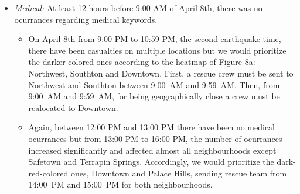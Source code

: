 \begin{itemize}                                                                  
     \item \emph{Medical:} At least 12 hours before 9:00 AM of April 8th, there was no ocurrances regarding
medical keywords. 
\begin{itemize} 
\item On April 8th from 9:00 PM to 10:59 PM, the second earthquake
time, there have been casualties on multiple locations
but we would prioritize the darker colored ones according to the heatmap of Figure 8a:
Northwest, Southton and Downtown. First, a rescue crew must be sent to Northwest
and Southton between     
     9:00~AM and 9:59~AM. Then, from 9:00~AM and 9:59~AM, for being geographically close a crew must be realocated to
Downtown. 

\item Again, between 12:00 PM and 13:00 PM there have been no medical ocurrances but from 13:00 PM
to 16:00 PM, the number of ocurrances increased significantly and affected
almost all neighbourhoods except Safetown and Terrapin Springs. Accordingly, we
would prioritize the dark-red-colored ones, Downtown and Palace Hills, sending
rescue team from 14:00~PM and 15:00~PM for both neighbourhoods.  


\end{itemize}
\end{itemize}
